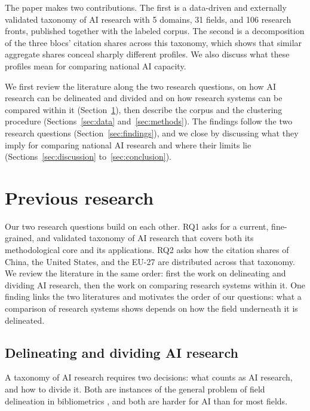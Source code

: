 \documentclass[10pt,twocolumn,a4paper]{article}
\begin{document}
	The paper makes two contributions. The first is a data-driven and externally validated taxonomy of AI research with 5 domains, 31 fields, and 106 research fronts, published together with the labeled corpus. The second is a decomposition of the three blocs' citation shares across this taxonomy, which shows that similar aggregate shares conceal sharply different profiles. We also discuss what these profiles mean for comparing national AI capacity.
	
	We first review the literature along the two research questions, on how AI research can be delineated and divided and on how research systems can be compared within it (Section~\ref{sec:literature}), then describe the corpus and the clustering procedure (Sections~\ref{sec:data} and~\ref{sec:methods}). The findings follow the two research questions (Section~\ref{sec:findings}), and we close by discussing what they imply for comparing national AI research and where their limits lie (Sections~\ref{sec:discussion} to~\ref{sec:conclusion}).
	
	\section{Previous research}
	\label{sec:literature}
	
	Our two research questions build on each other. RQ1 asks for a current, fine-grained, and validated taxonomy of AI research that covers both its methodological core and its applications. RQ2 asks how the citation shares of China, the United States, and the EU-27 are distributed across that taxonomy. We review the literature in the same order: first the work on delineating and dividing AI research, then the work on comparing research systems within it. One finding links the two literatures and motivates the order of our questions: what a comparison of research systems shows depends on how the field underneath it is delineated.
	
	\subsection{Delineating and dividing AI research}
	\label{sec:lit_taxonomy}
	
	A taxonomy of AI research requires two decisions: what counts as AI research, and how to divide it. Both are instances of the general problem of field delineation in bibliometrics \parencite{zitt2019bibliometric}, and both are harder for AI than for most fields.
	
\end{document}
